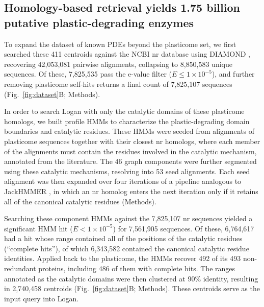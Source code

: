 \documentclass[pdflatex,sn-nature,iicol]{sn-jnl}%
\begin{document}
\subsection{Homology-based retrieval yields 1.75 billion putative plastic-degrading enzymes}

To expand the dataset of known PDEs beyond the plasticome set, we first searched these 411 centroids against the NCBI nr database using DIAMOND \citep{buchfink2021diamond}, recovering 42,053,081 pairwise alignments, collapsing to 8,850,583 unique sequences. Of these, 7,825,535 pass the e-value filter ($E \le 1\times10^{-5}$), and further removing plasticome self-hits returns a final count of 7,825,107 sequences (Fig.~\ref{fig:dataset}B; Methods).

In order to search Logan with only the catalytic domains of these plasticome homologs, we built profile HMMs to characterize the plastic-degrading domain boundaries and catalytic residues. These HMMs were seeded from alignments of plasticome sequences together with their closest nr homologs, where each member of the alignments must contain the residues involved in the catalytic mechanism, annotated from the literature. The 46 graph components were further segmented using these catalytic mechanisms, resolving into 53 seed alignments. Each seed alignment was then expanded over four iterations of a pipeline analogous to JackHMMER \citep{johnson2010jackhmmer}, in which an nr homolog enters the next iteration only if it retains all of the canonical catalytic residues (Methods).

Searching these component HMMs against the 7,825,107 nr sequences yielded a significant HMM hit ($E < 1\times10^{-5}$) for 7,561,905 sequences. Of these, 6,764,617 had a hit whose range contained all of the positions of the catalytic residues (``complete hits''), of which 6,343,582 contained the canonical catalytic residue identities. Applied back to the plasticome, the HMMs recover 492 of its 493 non-redundant proteins, including 486 of them with complete hits. The ranges annotated as the catalytic domains were then clustered at 90\% identity, resulting in 2,740,458 centroids (Fig.~\ref{fig:dataset}B; Methods). These centroids serve as the input query into Logan.
\end{document}
